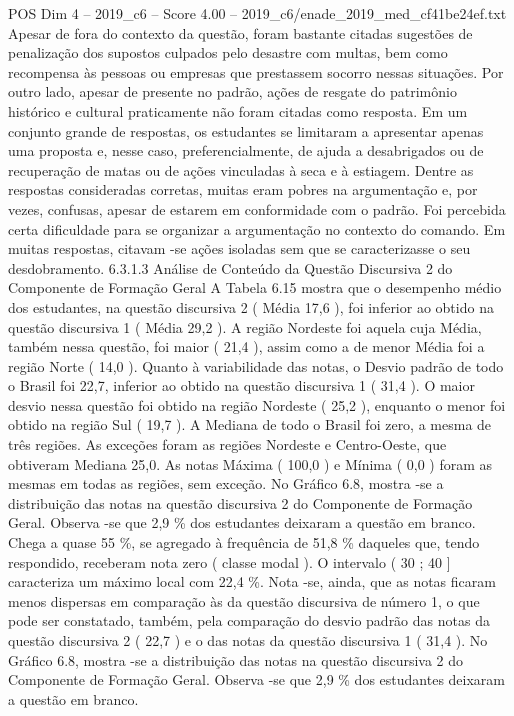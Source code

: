 \begin{textsample}{POS Dim 4 – 2019\_c6 – Score 4.00 – 2019\_c6/enade\_2019\_med\_cf41be24ef.txt}
Apesar de fora do contexto da questão, foram bastante citadas sugestões de penalização dos supostos culpados pelo desastre com multas, bem como recompensa às pessoas ou empresas que prestassem socorro nessas situações.
Por outro lado, apesar de presente no padrão, ações de resgate do patrimônio histórico e cultural praticamente não foram citadas como resposta.
Em um conjunto grande de respostas, os estudantes se limitaram a apresentar apenas uma proposta e, nesse caso, preferencialmente, de ajuda a desabrigados ou de recuperação de matas ou de ações vinculadas à seca e à estiagem.
Dentre as respostas consideradas corretas, muitas eram pobres na argumentação e, por vezes, confusas, apesar de estarem em conformidade com o padrão.
Foi percebida certa dificuldade para se organizar a argumentação no contexto do comando.
Em muitas respostas, citavam -se ações isoladas sem que se caracterizasse o seu desdobramento. 6.3.1.3 Análise de Conteúdo da Questão Discursiva 2 do Componente de Formação Geral A Tabela 6.15 mostra que o desempenho médio dos estudantes, na questão discursiva 2 ( Média 17,6 ), foi inferior ao obtido na questão discursiva 1 ( Média 29,2 ).
A região Nordeste foi aquela cuja Média, também nessa questão, foi maior ( 21,4 ), assim como a de menor Média foi a região Norte ( 14,0 ).
Quanto à variabilidade das notas, o Desvio padrão de todo o Brasil foi 22,7, inferior ao obtido na questão discursiva 1 ( 31,4 ).
O maior desvio nessa questão foi obtido na região Nordeste ( 25,2 ), enquanto o menor foi obtido na região Sul ( 19,7 ).
A Mediana de todo o Brasil foi zero, a mesma de três regiões.
As exceções foram as regiões Nordeste e Centro-Oeste, que obtiveram Mediana 25,0.
As notas Máxima ( 100,0 ) e Mínima ( 0,0 ) foram as mesmas em todas as regiões, sem exceção.
No Gráfico 6.8, mostra -se a distribuição das notas na questão discursiva 2 do Componente de Formação Geral.
Observa -se que 2,9 \% dos estudantes deixaram a questão em branco.
Chega a quase 55 \%, se agregado à frequência de 51,8 \% daqueles que, tendo respondido, receberam nota zero ( classe modal ).
O intervalo ( 30 ; 40 ] caracteriza um máximo local com 22,4 \%.
Nota -se, ainda, que as notas ficaram menos dispersas em comparação às da questão discursiva de número 1, o que pode ser constatado, também, pela comparação do desvio padrão das notas da questão discursiva 2 ( 22,7 ) e o das notas da questão discursiva 1 ( 31,4 ).
No Gráfico 6.8, mostra -se a distribuição das notas na questão discursiva 2 do Componente de Formação Geral.
Observa -se que 2,9 \% dos estudantes deixaram a questão em branco.

\end{textsample}
